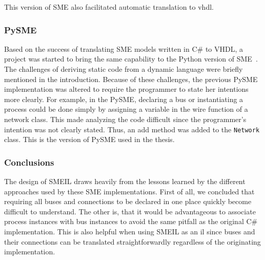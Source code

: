This version of SME also facilitated automatic translation to \gls{vhdl}.

\subsubsection{ PySME}
Based on the success of translating SME models written in C\# to VHDL, a project
was started to bring the same capability to the Python version of
SME~\cite{asheim2016vhdl}. The challenges of deriving static code from a dynamic
language were briefly mentioned in the introduction. Because of these
challenges, the previous PySME implementation was altered to require the
programmer to state her intentions more clearly. For example, in the 
PySME, declaring a bus or instantiating a process could be done simply by
assigning a variable in the {\ttfamily wire} function of a network class. This
made analyzing the code difficult since the programmer's intention was not
clearly stated. Thus, an {\ttfamily add} method was added to the
\texttt{Network} class. This is the version of PySME used in the thesis.

\subsubsection{Conclusions}
The design of SMEIL draws heavily from the lessons learned by the different
approaches used by these SME implementations. 
First of all, we concluded that requiring all buses and connections to be
declared in one place quickly become difficult to understand. The other is, that
it would be advantageous to associate process instances with bus instances to
avoid the same pitfall as the original C\# implementation. This is also helpful
when using SMEIL as an \gls{il} since buses and their connections can be
translated straightforwardly regardless of the originating implementation.


